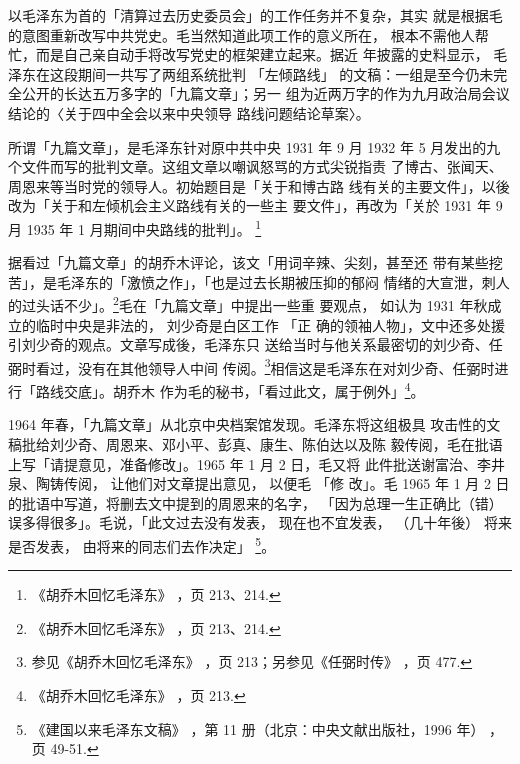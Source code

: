 以毛泽东为首的「清算过去历史委员会」的工作任务并不复杂，其实
就是根据毛的意图重新改写中共党史。毛当然知道此项工作的意义所在，
根本不需他人帮忙，而是自己亲自动手将改写党史的框架建立起来。据近
年披露的史料显示，
毛泽东在这段期间一共写了两组系统批判
「左倾路线」
的文稿：一组是至今仍未完全公开的长达五万多字的「九篇文章」；另一
组为近两万字的作为九月政治局会议结论的〈关于四中全会以来中央领导
路线问题结论草案〉。

所谓「九篇文章」，是毛泽东针对原中共中央 1931 年 9 月 1932 年 5
月发出的九个文件而写的批判文章。这组文章以嘲讽怒骂的方式尖锐指责
了博古、张闻天、周恩来等当时党的领导人。初始题目是「关于和博古路
线有关的主要文件」，以後改为「关于和左倾机会主义路线有关的一些主
要文件」，再改为「关於 1931 年 9 月 1935 年 1 月期间中央路线的批判」。
\footnote{《胡乔木回忆毛泽东》
，页 213、214.}

据看过「九篇文章」的胡乔木评论，该文「用词辛辣、尖刻，甚至还
带有某些挖苦」，是毛泽东的「激愤之作」，「也是过去长期被压抑的郁闷
情绪的大宣泄，刺人的过头话不少」。\footnote{《胡乔木回忆毛泽东》
，页 213、214.}毛在「九篇文章」中提出一些重
要观点，
如认为 1931 年秋成立的临时中央是非法的，
刘少奇是白区工作
「正
确的领袖人物」，文中还多处援引刘少奇的观点。文章写成後，毛泽东只
送给当时与他关系最密切的刘少奇、任弼时看过，没有在其他领导人中间
传阅。\footnote{参见《胡乔木回忆毛泽东》
，页 213；另参见《任弼时传》
，页 477.}相信这是毛泽东在对刘少奇、任弼时进行「路线交底」。胡乔木
作为毛的秘书，「看过此文，属于例外」\footnote{《胡乔木回忆毛泽东》
，页 213.}。

1964 年春，「九篇文章」从北京中央档案馆发现。毛泽东将这组极具
攻击性的文稿批给刘少奇、周恩来、邓小平、彭真、康生、陈伯达以及陈
毅传阅，毛在批语上写「请提意见，准备修改」。1965 年 1 月 2 日，毛又将
此件批送谢富治、李井泉、陶铸传阅，
让他们对文章提出意见，
以便毛
「修
改」。毛 1965 年 1 月 2 日的批语中写道，将删去文中提到的周恩来的名字，
「因为总理一生正确比（错）误多得很多」。毛说，「此文过去没有发表，
现在也不宜发表， （几十年後）
将来
是否发表，
由将来的同志们去作决定」
\footnote{《建国以来毛泽东文稿》
，第 11 册（北京：中央文献出版社，1996 年）
，页 49-51.}。

